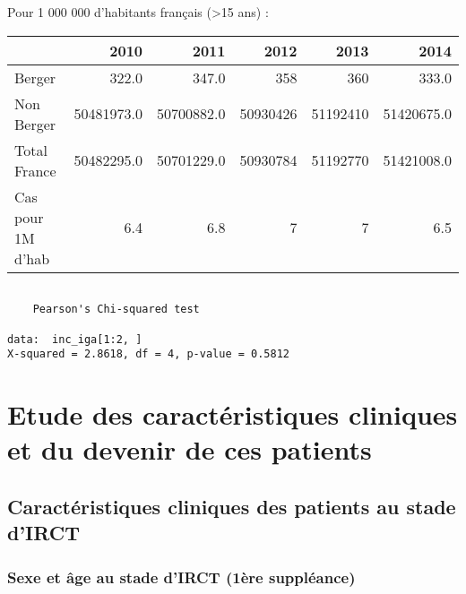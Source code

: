 \documentclass[11pt,a4paper]{article}\usepackage[]{graphicx}\usepackage[]{color}
\makeatletter
\newenvironment{kframe}{%
 \def\at@end@of@kframe{}%
 \ifinner\ifhmode%
  \def\at@end@of@kframe{\end{minipage}}%
  \begin{minipage}{\columnwidth}%
 \fi\fi%
 \def\FrameCommand##1{\hskip\@totalleftmargin \hskip-\fboxsep
 \colorbox{shadecolor}{##1}\hskip-\fboxsep
     \hskip-\linewidth \hskip-\@totalleftmargin \hskip\columnwidth}%
 \MakeFramed {\advance\hsize-\width
   \@totalleftmargin\z@ \linewidth\hsize
   \@setminipage}}%
 {\par\unskip\endMakeFramed%
 \at@end@of@kframe}
\newenvironment{knitrout}{}{} %
\makeatother
\begin{document}
Pour 1 000 000 d'habitants français (\textgreater 15 ans) :

\begin{table}[H]
\centering
\begin{tabular}{lrrrrr}
  \hline
 & 2010 & 2011 & 2012 & 2013 & 2014 \\ 
  \hline
Berger & 322.0 & 347.0 & 358 & 360 & 333.0 \\ 
  Non Berger & 50481973.0 & 50700882.0 & 50930426 & 51192410 & 51420675.0 \\ 
  Total France & 50482295.0 & 50701229.0 & 50930784 & 51192770 & 51421008.0 \\ 
  Cas pour 1M d'hab & 6.4 & 6.8 & 7 & 7 & 6.5 \\ 
   \hline
\end{tabular}
\end{table}


\begin{knitrout}
\color{fgcolor}\begin{kframe}
\begin{verbatim}

	Pearson's Chi-squared test

data:  inc_iga[1:2, ]
X-squared = 2.8618, df = 4, p-value = 0.5812
\end{verbatim}
\end{kframe}
\end{knitrout}

\section{Etude des caractéristiques cliniques et du devenir de ces patients}

  \subsection{Caractéristiques cliniques des patients au stade d’IRCT}
  
    \subsubsection{Sexe et âge au stade d’IRCT (1ère suppléance)}
\end{document}
